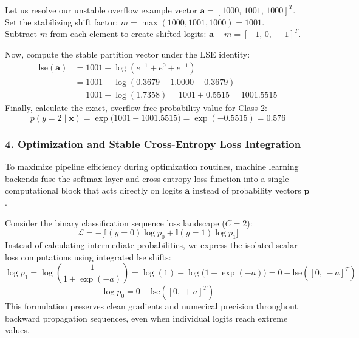 \documentclass{article}
\begin{document}
\begin{tcolorbox}[colback=red!5!white, colframe=red!60!black, title=Numerical Verification Example]
Let us resolve our unstable overflow example vector $\boldsymbol{a} = [1000, \, 1001, \, 1000]^T$. \\
Set the stabilizing shift factor: $m = \max(1000, 1001, 1000) = 1001$. \\
Subtract $m$ from each element to create shifted logits: $\boldsymbol{a} - m = [-1, \, 0, \, -1]^T$. 

Now, compute the stable partition vector under the LSE identity:
\begin{align*}
    \text{lse}(\boldsymbol{a}) &= 1001 + \log\left(e^{-1} + e^0 + e^{-1}\right) \\
    &= 1001 + \log\left(0.3679 + 1.0000 + 0.3679\right) \\
    &= 1001 + \log(1.7358) = 1001 + 0.5515 = \mathbf{1001.5515}
\end{align*}
Finally, calculate the exact, overflow-free probability value for Class 2:
\begin{equation*}
    p(y=2 \mid \boldsymbol{x}) = \exp\big(1001 - 1001.5515\big) = \exp(-0.5515) = \mathbf{0.576}
\end{equation*}
\end{tcolorbox}

\subsubsection*{4. Optimization and Stable Cross-Entropy Loss Integration}
To maximize pipeline efficiency during optimization routines, machine learning backends fuse the softmax layer and cross-entropy loss function into a single computational block that acts directly on logits $\boldsymbol{a}$ instead of probability vectors $\boldsymbol{p}$. 

Consider the binary classification sequence loss landscape ($C=2$):
\begin{equation}
    \mathcal{L} = - \big[\mathbb{I}(y = 0) \log p_0 + \mathbb{I}(y = 1) \log p_1\big]
\end{equation}
Instead of calculating intermediate probabilities, we express the isolated scalar loss computations using integrated $\text{lse}$ shifts:
\begin{equation}
    \log p_1 = \log \left( \frac{1}{1 + \exp(-a)} \right) = \log(1) - \log\big(1 + \exp(-a)\big) = 0 - \text{lse}([0, \, -a]^T)
\end{equation}
\begin{equation}
    \log p_0 = 0 - \text{lse}([0, \, +a]^T)
\end{equation}
This formulation preserves clean gradients and numerical precision throughout backward propagation sequences, even when individual logits reach extreme values.
\end{document}
